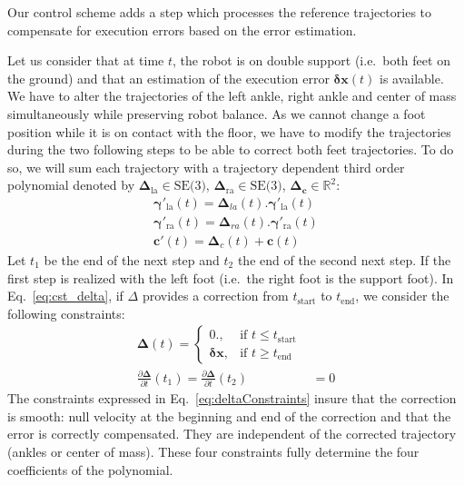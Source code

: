 Our control scheme adds a step which processes the reference trajectories to compensate for execution errors based on the error estimation.

Let us consider that at time $t$, the robot is on double support (i.e.\ both feet on the ground) and that an estimation of the execution error $\mathbf{\delta \mathbf{x}}(t)$ is available. We have to alter the trajectories of the left ankle, right ankle and center of mass simultaneously while preserving robot balance. As we cannot change a foot position while it is on contact with the floor, we have
to modify the trajectories during the two following steps to be able to correct both feet trajectories. To do so, we will sum each trajectory with a trajectory dependent third order polynomial denoted
by $\mathbf{\Delta}_{\text{la}} \in \text{SE(3)}$,
$\mathbf{\Delta}_{\text{ra}} \in \text{SE(3)}$,
$\mathbf{\Delta}_{\mathbf{c}} \in \mathbb{R}^2$:
%
\begin{equation}
  \begin{aligned}
    \mathbf{\gamma}'_{\text{la}}(t) = \mathbf{\Delta}_{la}(t) . \mathbf{\gamma}'_{\text{la}}(t)\\
    \mathbf{\gamma}'_{\text{ra}}(t) = \mathbf{\Delta}_{ra}(t) . \mathbf{\gamma}'_{\text{ra}}(t)\\
    \mathbf{c}'(t) = \mathbf{\Delta}_{c}(t) + \mathbf{c}(t)
  \end{aligned}
  \label{eq:cst_delta}
\end{equation}
%
Let $t_1$ be the end of the next step and $t_2$ the end of the second next step. If the first step is realized with the left foot (i.e.\ the right foot is the support foot). In Eq.~\ref{eq:cst_delta}, if
$\Delta$ provides a correction from $t_{\text{start}}$ to $t_{\text{end}}$, we consider the following constraints:
%
\begin{equation}
\begin{aligned}
  \mathbf{\Delta}(t) =
  \begin{cases}
    0.,  & \mbox{if }t\mbox{$\leq t_{\text{start}}$} \\
    \mathbf{\delta x}, & \mbox{if }t\mbox{$\geq t_{\text{end}}$}
  \end{cases}\\
  \frac{\partial \mathbf{\Delta}}{\partial t}(t_1) = \frac{\partial
    \mathbf{\Delta}}{\partial t}(t_2) &= 0
\end{aligned}
\label{eq:deltaConstraints}
\end{equation}
%
The constraints expressed in Eq.~\ref{eq:deltaConstraints} insure that the correction is smooth: null velocity at the beginning and end of the correction and that the error is correctly compensated. They are
independent of the corrected trajectory (ankles or center of mass). These four constraints fully determine the four coefficients of the polynomial.

